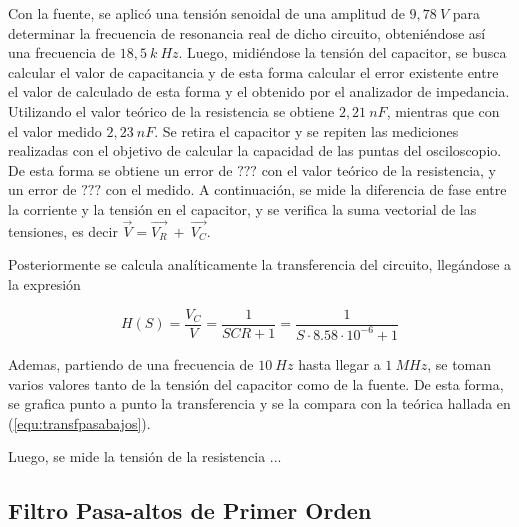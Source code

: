 \documentclass[a4paper]{article}
\begin{document}
Con la fuente, se aplicó una tensión senoidal de una amplitud de $9,78 \ V$ para determinar la frecuencia de resonancia real de dicho circuito, obteniéndose así una frecuencia de $18,5 \ k\ Hz$. Luego, midiéndose la tensión del capacitor, se busca calcular el valor de capacitancia y de esta forma calcular el error existente entre el valor de calculado de esta forma y el obtenido por el analizador de impedancia. Utilizando el valor teórico de la resistencia se obtiene $2,21  \ nF  $, mientras que con el valor medido $2,23  \ nF  $. Se retira el capacitor y se repiten las mediciones realizadas con el objetivo de calcular la capacidad de las puntas del osciloscopio. De esta forma se obtiene un error de $ ???  $ con el valor teórico de la resistencia, y un error de $  ???  $ con el medido.
A continuación, se mide la diferencia de fase entre la corriente y la tensión en el capacitor, y se verifica la suma vectorial de las tensiones, es decir $ \overrightarrow{V} = \overrightarrow{V_R} \ + \ \overrightarrow{V_C} $.


Posteriormente se calcula analíticamente la transferencia del circuito, llegándose a la expresión

\begin{equation}
	H \left(S \right) = \frac{V_C}{V} = \frac{1}{SCR + 1} = \frac{1}{S \cdot 8.58 \cdot 10^{-6} + 1}
	\label{equ:transfpasabajos}
\end{equation}

Ademas, partiendo de una frecuencia de $ 10 \ Hz $ hasta llegar a $ 1 \ MHz $, se toman varios valores tanto de la tensión del capacitor como de la fuente. De esta forma, se grafica punto a punto la transferencia y se la compara con la teórica hallada en (\ref{equ:transfpasabajos}).


Luego, se mide la tensión de la resistencia ...

\subsection*{Filtro Pasa-altos de Primer Orden}
\end{document}
